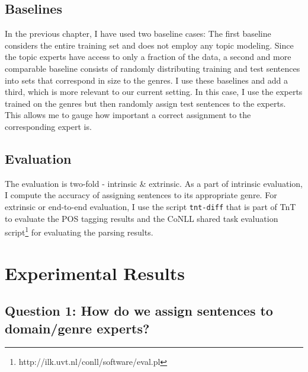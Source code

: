 \subsection{Baselines}

In the previous chapter, I have used two baseline cases: The first baseline considers the entire training set and does not employ any topic modeling. Since the topic experts have access to only a fraction of the data, a second and more comparable baseline consists of  randomly distributing  training and test sentences into sets that correspond in size to the genres. I use these baselines and add a third, which is more relevant to our current setting. In this case, I use the experts trained on the genres but then randomly assign test sentences to the experts. This allows me to gauge how important a correct assignment to the corresponding expert is. 




\subsection{Evaluation}

The evaluation is two-fold - intrinsic \& extrinsic. As a part of intrinsic evaluation, I compute the accuracy of assigning sentences to its appropriate genre. For extrinsic or end-to-end evaluation, I use the script \texttt{tnt-diff} that is part of TnT to evaluate the POS tagging results  and the CoNLL shared task evaluation script\footnote{http://ilk.uvt.nl/conll/software/eval.pl} for evaluating the parsing results.


\section{Experimental Results} \label{exptres}

\subsection*{Question 1: How do we assign sentences to domain/genre experts?}

